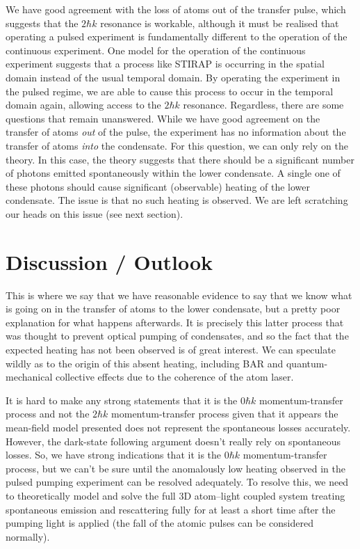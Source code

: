 We have good agreement with the loss of atoms out of the transfer pulse, which suggests that the $2 \hbar k$ resonance is workable, although it must be realised that operating a pulsed experiment is fundamentally different to the operation of the continuous experiment.  One model for the operation of the continuous experiment suggests that a process like STIRAP is occurring in the spatial domain instead of the usual temporal domain.  By operating the experiment in the pulsed regime, we are able to cause this process to occur in the temporal domain again, allowing access to the $2 \hbar k$ resonance.  Regardless, there are some questions that remain unanswered.  While we have good agreement on the transfer of atoms \emph{out} of the pulse, the experiment has no information about the transfer of atoms \emph{into} the condensate.  For this question, we can only rely on the theory.  In this case, the theory suggests that there should be a significant number of photons emitted spontaneously within the lower condensate.  A single one of these photons should cause significant (observable) heating of the lower condensate.  The issue is that no such heating is observed.  We are left scratching our heads on this issue (see next section).

\section{Discussion / Outlook}
\label{OpticalPumping:Discussion}

This is where we say that we have reasonable evidence to say that we know what is going on in the transfer of atoms to the lower condensate, but a pretty poor explanation for what happens afterwards.  It is precisely this latter process that was thought to prevent optical pumping of condensates, and so the fact that the expected heating has not been observed is of great interest.  We can speculate wildly as to the origin of this absent heating, including BAR and quantum-mechanical collective effects due to the coherence of the atom laser.

It is hard to make any strong statements that it is the $0 \hbar k$ momentum-transfer process and not the $2 \hbar k$ momentum-transfer process given that it appears the mean-field model presented does not represent the spontaneous losses accurately.  However, the dark-state following argument doesn't really rely on spontaneous losses.  So, we have strong indications that it is the $0 \hbar k$ momentum-transfer process, but we can't be sure until the anomalously low heating observed in the pulsed pumping experiment can be resolved adequately.  To resolve this, we need to theoretically model and solve the full 3D atom--light coupled system treating spontaneous emission and rescattering fully for at least a short time after the pumping light is applied (the fall of the atomic pulses can be considered normally).

